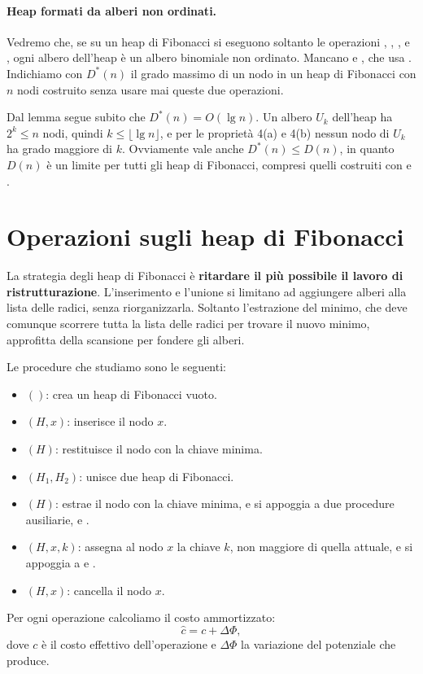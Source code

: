 \paragraph{Heap formati da alberi non ordinati.}
Vedremo che, se su un heap di Fibonacci si eseguono soltanto le operazioni \MakeHeap{}, \Insert{}, \Minimum{}, \ExtractMin{} e \Union{}, ogni albero dell'heap è un albero binomiale non ordinato. Mancano \DecreaseKey{} e \Delete{}, che usa \DecreaseKey{}. Indichiamo con $D^*(n)$ il grado massimo di un nodo in un heap di Fibonacci con $n$ nodi costruito senza usare mai queste due operazioni.

Dal lemma segue subito che $D^*(n) = O(\lg n)$. Un albero $U_k$ dell'heap ha $2^k \le n$ nodi, quindi $k \le \lfloor \lg n \rfloor$, e per le proprietà 4(a) e 4(b) nessun nodo di $U_k$ ha grado maggiore di $k$. Ovviamente vale anche $D^*(n) \le D(n)$, in quanto $D(n)$ è un limite per tutti gli heap di Fibonacci, compresi quelli costruiti con \DecreaseKey{} e \Delete{}.

\section{Operazioni sugli heap di Fibonacci}\label{sec:hf-op}
La strategia degli heap di Fibonacci è \textbf{ritardare il più possibile il lavoro di ristrutturazione}. L'inserimento e l'unione si limitano ad aggiungere alberi alla lista delle radici, senza riorganizzarla. Soltanto l'estrazione del minimo, che deve comunque scorrere tutta la lista delle radici per trovare il nuovo minimo, approfitta della scansione per fondere gli alberi.

Le procedure che studiamo sono le seguenti:
\begin{itemize}
    \item \MakeFibHeap$()$: crea un heap di Fibonacci vuoto.
    \item \FibHeapInsert$(H,x)$: inserisce il nodo $x$.
    \item \Minimum$(H)$: restituisce il nodo con la chiave minima.
    \item \FibHeapUnion$(H_1,H_2)$: unisce due heap di Fibonacci.
    \item \FibHeapExtractMin$(H)$: estrae il nodo con la chiave minima, e si appoggia a due procedure ausiliarie, \Consolidate{} e \FibHeapLink{}.
    \item \FibHeapDecreaseKey$(H,x,k)$: assegna al nodo $x$ la chiave $k$, non maggiore di quella attuale, e si appoggia a \Cut{} e \CascadingCut{}.
    \item \FibHeapDelete$(H,x)$: cancella il nodo $x$.
\end{itemize}
Per ogni operazione calcoliamo il costo ammortizzato:
\[
\hat{c} = c + \Delta\Phi,
\]
dove $c$ è il costo effettivo dell'operazione e $\Delta\Phi$ la variazione del potenziale che produce.

